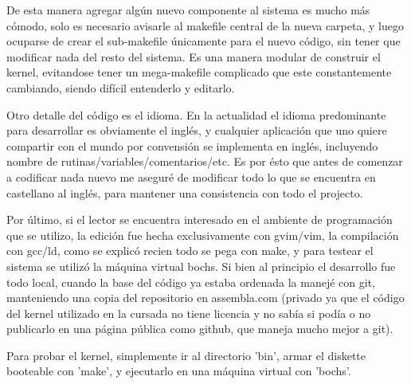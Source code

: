 De esta manera agregar algún nuevo componente al sistema es mucho más cómodo,
solo es necesario avisarle al makefile central de la nueva carpeta, y luego
ocuparse de crear el sub-makefile únicamente para el nuevo código, sin tener que
modificar nada del resto del sistema. Es una manera modular de construir el
kernel, evitandose tener un mega-makefile complicado que este constantemente
cambiando, siendo difícil entenderlo y editarlo.

Otro detalle del código es el idioma. En la actualidad el idioma predominante
para desarrollar es obviamente el inglés, y cualquier aplicación que uno quiere
compartir con el mundo por convensión se implementa en inglés, incluyendo nombre
de rutinas/variables/comentarios/etc. Es por ésto que antes de comenzar a
codificar nada nuevo me aseguré de modificar todo lo que se encuentra en
castellano al inglés, para mantener una consistencia con todo el projecto.

Por último, si el lector se encuentra interesado en el ambiente de programación
que se utilizo, la edición fue hecha exclusivamente con gvim/vim, la compilación
con gcc/ld, como se explicó recien todo se pega con make, y para testear el
sistema se utilizó la máquina virtual bochs. Si bien al principio el desarrollo
fue todo local, cuando la base del código ya estaba ordenada la manejé con git,
manteniendo una copia del repositorio en assembla.com (privado ya que el código
del kernel utilizado en la cursada no tiene licencia y no sabía si podía o no
publicarlo en una página pública como github, que maneja mucho mejor a git).

Para probar el kernel, simplemente ir al directorio 'bin', armar el diskette
booteable con 'make', y ejecutarlo en una máquina virtual con 'bochs'.
